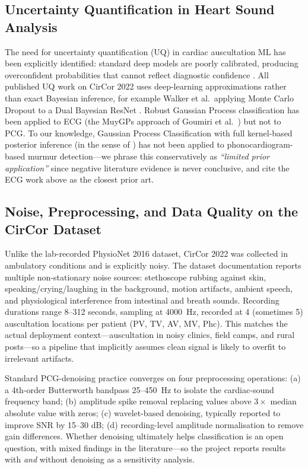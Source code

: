 \documentclass[10pt,twocolumn]{article}
\begin{document}
\subsection{Uncertainty Quantification in Heart Sound Analysis}

The need for uncertainty quantification (UQ) in cardiac auscultation ML has been explicitly identified: standard deep models are poorly calibrated, producing overconfident probabilities that cannot reflect diagnostic confidence \citep{guo2017}. All published UQ work on CirCor 2022 uses deep-learning approximations rather than exact Bayesian inference, for example Walker et al.\ applying Monte Carlo Dropout to a Dual Bayesian ResNet \citep{walker2022dbres}. Robust Gaussian Process classification has been applied to ECG (the MuyGPs approach of Goumiri et al.\ \citep{muygps2024}) but not to PCG. To our knowledge, Gaussian Process Classification with full kernel-based posterior inference (in the sense of \citet{rasmussen2006}) has not been applied to phonocardiogram-based murmur detection---we phrase this conservatively as \textit{``limited prior application''} since negative literature evidence is never conclusive, and cite the ECG work above as the closest prior art.

\subsection{Noise, Preprocessing, and Data Quality on the CirCor Dataset}

Unlike the lab-recorded PhysioNet 2016 dataset, CirCor 2022 was collected in ambulatory conditions and is explicitly noisy. The dataset documentation \citep{circor_data, challenge2022} reports multiple non-stationary noise sources: stethoscope rubbing against skin, speaking/crying/laughing in the background, motion artifacts, ambient speech, and physiological interference from intestinal and breath sounds. Recording durations range 8--312 seconds, sampling at 4000~Hz, recorded at 4 (sometimes 5) auscultation locations per patient (PV, TV, AV, MV, Phc). This matches the actual deployment context---auscultation in noisy clinics, field camps, and rural posts---so a pipeline that implicitly assumes clean signal is likely to overfit to irrelevant artifacts.

Standard PCG-denoising practice converges on four preprocessing operations: (a) a 4th-order Butterworth bandpass 25--450~Hz to isolate the cardiac-sound frequency band; (b) amplitude spike removal replacing values above $3\times$ median absolute value with zeros; (c) wavelet-based denoising, typically reported to improve SNR by 15--30 dB; (d) recording-level amplitude normalisation to remove gain differences. Whether denoising ultimately helps classification is an open question, with mixed findings in the literature---so the project reports results with \textit{and} without denoising as a sensitivity analysis.
\end{document}
